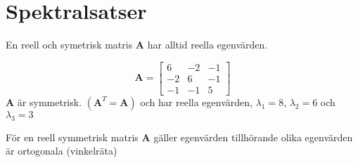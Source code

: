\section{Spektralsatser} %
\label{sec:spektralsatser}
\begin{sats}
	En reell och symetrisk matris \textbf{A} har alltid reella egenvärden.
\end{sats}
\begin{Ex}
	\[
	\mathbf{A} =
	\begin{bmatrix}
		6 & -2 & -1\\
		-2 & 6 & -1\\
		-1 & -1 & 5
	\end{bmatrix}
	\]
	\textbf{A} är symmetrisk. $(\mathbf{A}^T = \mathbf{A})$ och har reella egenvärden, $\lambda_1 = 8$, $\lambda_2 = 6$ och $\lambda_3 = 3$
\end{Ex}
\begin{sats}
	För en reell symmetrisk matris \textbf{A} gäller egenvärden tillhörande olika egenvärden är ortogonala (vinkelräta)
\end{sats}
